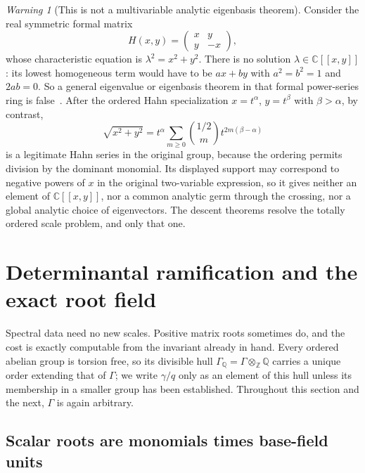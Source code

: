 \documentclass[11pt,a4paper]{article}
\numberwithin{equation}{section}
\theoremstyle{definition}
\theoremstyle{remark}
\newtheorem{warning}[warning]{Warning}
\newcommand{\C}{\mathbb C}
\newcommand{\Q}{\mathbb Q}
\newcommand{\Z}{\mathbb Z}
\begin{document}
\begin{warning}[This is not a multivariable analytic eigenbasis theorem]\label{spec:warn:crossing}
Consider the real symmetric formal matrix
\begin{equation}\label{spec:eq:crossing}
 H(x,y)=\begin{pmatrix}x&y\\y&-x\end{pmatrix},
\end{equation}
whose characteristic equation is $\lambda^2=x^2+y^2$. There is no solution
$\lambda\in\C[[x,y]]$: its lowest homogeneous term would have to be $ax+by$
with $a^2=b^2=1$ and $2ab=0$. So a general eigenvalue or eigenbasis theorem
in that formal power-series ring is false~\cite{PR,DLLZ}. After the ordered
Hahn specialization $x=t^\alpha$, $y=t^\beta$ with $\beta>\alpha$, by
contrast,
\[
 \sqrt{x^2+y^2}=t^\alpha\sum_{m\ge0}\binom{1/2}{m}t^{2m(\beta-\alpha)}
\]
is a legitimate Hahn series in the original group, because the ordering
permits division by the dominant monomial. Its displayed support may
correspond to negative powers of $x$ in the original two-variable
expression, so it gives neither an element of $\C[[x,y]]$, nor a common
analytic germ through the crossing, nor a global analytic choice of
eigenvectors. The descent theorems resolve the totally ordered scale
problem, and only that one.
\end{warning}

\section{Determinantal ramification and the exact root field}
\label{spec:sec:ramification}

Spectral data need no new scales. Positive matrix roots sometimes do, and
the cost is exactly computable from the invariant already in hand. Every
ordered abelian group is torsion free, so its divisible hull
$\Gamma_\Q=\Gamma\otimes_\Z\Q$ carries a unique order extending that of
$\Gamma$; we write $\gamma/q$ only as an element of this hull unless its
membership in a smaller group has been established. Throughout this section
and the next, $\Gamma$ is again arbitrary.

\subsection{Scalar roots are monomials times base-field units}
\end{document}
